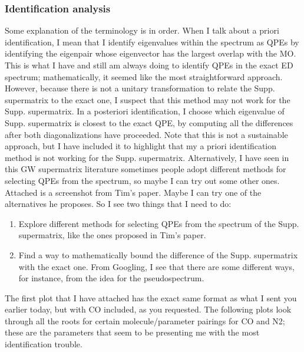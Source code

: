 \subsubsection{Identification analysis}
Some explanation of the terminology is in order. When I talk about a priori identification, I mean that I identify eigenvalues within the spectrum as QPEs by identifying the eigenpair whose eigenvector has the largest overlap with the MO. This is what I have and still am always doing to identify QPEs in the exact ED spectrum; mathematically, it seemed like the most straightforward approach. However, because there is not a unitary transformation to relate the Supp. supermatrix to the exact one, I suspect that this method may not work for the Supp. supermatrix. In a posteriori identification, I choose which eigenvalue of Supp. supermatrix is closest to the exact QPE, by computing all the differences after both diagonalizations have proceeded. Note that this is not a sustainable approach, but I have included it to highlight that my a priori identification method is not working for the Supp. supermatrix. Alternatively, I have seen in this GW supermatrix literature sometimes people adopt different methods for selecting QPEs from the spectrum, so maybe I can try out some other ones. Attached is a screenshot from Tim's paper. Maybe I can try one of the alternatives he proposes. So I see two things that I need to do:
\begin{enumerate}
    \item Explore different methods for selecting QPEs from the spectrum of the Supp. supermatrix, like the ones proposed in Tim's paper.
    \item Find a way to mathematically bound the difference of the Supp. supermatrix with the exact one. From Googling, I see that there are some different ways, for instance, from the idea for the pseudospectrum. 
\end{enumerate}
The first plot that I have attached has the exact same format as what I sent you earlier today, but with CO included, as you requested. The following plots look through all the roots for certain molecule/parameter pairings for CO and N2; these are the parameters that seem to be presenting me with the most identification trouble.

